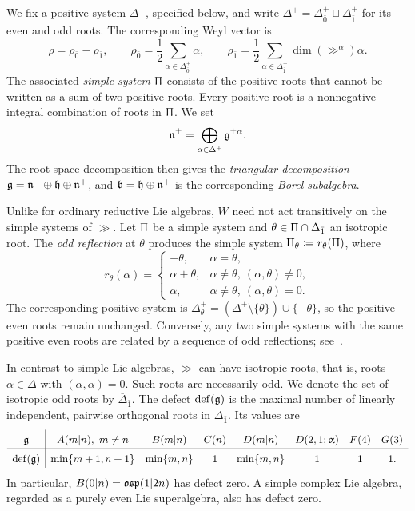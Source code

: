 We fix a positive system $\Delta^+$, specified below, and write $\Delta^+=\Delta_{\bar0}^+\sqcup\Delta_{\bar1}^+$ for its even and odd roots. The corresponding Weyl
vector is
\begin{equation}
\rho=\rho_{\bar0}-\rho_{\bar1},
\qquad
\rho_{\bar0}
=\frac12\sum_{\alpha\in\Delta_{\bar0}^+}\alpha,
\qquad
\rho_{\bar1}
=\frac12\sum_{\alpha\in\Delta_{\bar1}^+}
\dim(\gg^\alpha)\alpha.
\end{equation}
The associated \emph{simple system} $\Uppi$ consists of the
positive roots that cannot be written as a sum of two positive
roots. Every positive root is a nonnegative integral combination
of roots in $\Uppi$. We set
\begin{equation}
{\mathfrak{n}}^\pm
=\bigoplus_{\alpha\in\Delta^+}{\mathfrak{g}}^{\pm\alpha}.
\end{equation}
The root-space decomposition then gives the
\emph{triangular decomposition}
${\mathfrak{g}}={\mathfrak{n}}^-\oplus{\mathfrak h}\oplus{\mathfrak{n}}^+$, and
$\mathfrak b={\mathfrak h}\oplus{\mathfrak{n}}^+$ is the corresponding
\emph{Borel subalgebra}.

Unlike for ordinary reductive Lie algebras, $W$ need not act transitively on the simple systems of $\gg$. Let $\Uppi$ be a simple system and $\theta\in\Uppi\cap\Delta_{\bar1}$ an isotropic root. The \emph{odd reflection} at $\theta$ produces the simple system $\Uppi_\theta\coloneqq r_\theta(\Uppi)$, where
\begin{equation}
r_\theta(\alpha)=
\begin{cases}
-\theta,&\alpha=\theta,\\
\alpha+\theta,&\alpha\neq\theta,\ (\alpha,\theta)\neq0,\\
\alpha,&\alpha\neq\theta,\ (\alpha,\theta)=0.
\end{cases}
\label{eq::odd-reflection}
\end{equation}
The corresponding positive system is $\Delta_\theta^+=(\Delta^+\setminus\{\theta\})\cup\{-\theta\}$, so the positive even roots remain unchanged. Conversely, any two simple systems with the same positive even roots are related by a sequence of odd reflections; see~\cite{Serganova_reps}.

In contrast to simple Lie algebras, $\gg$ can have isotropic roots, that is, roots $\alpha\in\Delta$ with $(\alpha,\alpha)=0$. Such roots are necessarily odd. We denote the set of isotropic odd roots by
$
\overline{\Delta}_{\bar1}.
$
The defect ${\mathrm{def}}({\mathfrak{g}})$ is the maximal number of linearly independent, pairwise orthogonal roots in $\overline{\Delta}_{\bar1}$. 
Its values are
\begin{equation}
\renewcommand{\arraystretch}{1.5}
\begin{array}{c|ccccccc}
\gg
& A(m\vert n),\ m\neq n
& B(m\vert n)
& C(n)
& D(m\vert n)
& D(2,1;\upalpha)
& F(4)
& G(3)\\ \hline
\defect(\gg)
& \min\{m+1,n+1\}
& \min\{m,n\}
& 1
& \min\{m,n\}
& 1
& 1
& 1.
\end{array}
\end{equation}
In particular, $B(0\vert n)={\mathfrak{osp}}(1\vert2n)$ has defect zero. A simple complex Lie algebra, regarded as a purely even Lie superalgebra, also has defect zero.

